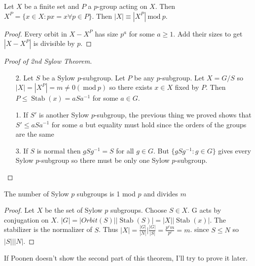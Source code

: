 \documentclass{article}
\renewcommand{\mod}[1]{\ \text{mod}\ #1}
\DeclareMathOperator{\Stab}{Stab}
\begin{document}
\begin{lemma}
Let $X$ be a finite set and $P$ a $p$-group acting on $X$. Then $X^P=\{x\in X:px=x\forall p\in P\}$. Then $|X|\equiv|X^P|\mod{p}$.
\end{lemma}
\begin{proof}
Every orbit in $X-X^P$ has size $p^a$ for some $a\geq 1$. Add their sizes to get $|X-X^P|$ is divisible by $p$.
\end{proof}
\begin{proof}[Proof of 2nd Sylow Theorem]
\begin{enumerate}
    \item[2.] Let $S$ be a Sylow $p$-subgroup. Let $P$ be any $p$-subgroup. Let $X=G/S$ so $|X|=|X^P|=m\neq 0(\mod{p})$ so there exists $x\in X$ fixed by $P$. Then $P\leq \Stab(x)=aSa^{-1}$ for some $a\in G$.
    \item[1.] If $S'$ is another Sylow $p$-subgroup, the previous thing we proved shows that $S'\leq aSa^{-1}$ for some $a$ but equality must hold since the orders of the groups are the same
    \item[3.] If $S$ is normal then $gSg^{-1}=S$ for all $g\in G$. But $\{gSg^{-1}:g\in G\}$ gives every Sylow $p$-subgroup so there must be only one Sylow $p$-subgroup.
\end{enumerate}
\end{proof}
\begin{theorem}
The number of Sylow $p$ subgroups is 1 mod $p$ and divides $m$
\end{theorem}
\begin{proof}
Let $X$ be the set of Sylow $p$ subgroups. Choose $S\in X$. G acts by conjugation on $X$. $|G|=|Orbit(S)||\Stab(S)|=|X||\Stab(x)|$. The stabilizer is the normalizer of $S$. Thus $|X|=\frac{|G|}{|N|}|\frac{|G|}{|S|}=\frac{p^em}{p^e}=m$.  since $S\leq N$ so $|S|||N|$.
\end{proof}
\begin{remark}
If Poonen doesn't show the second part of this theorem, I'll try to prove it later.
\end{remark}
\end{document}
